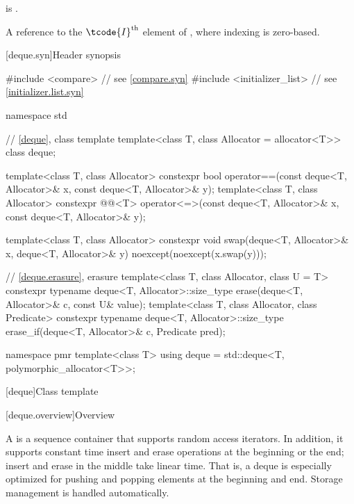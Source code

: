 \begin{itemdescr}
\pnum
\mandates
{} is .

\pnum
\returns
A reference to the $\tcode{I}^\text{th}$ element of ,
where indexing is zero-based.
\end{itemdescr}

[deque.syn]{Header  synopsis}

%
\begin{codeblock}
#include <compare>              // see \ref{compare.syn}
#include <initializer_list>     // see \ref{initializer.list.syn}

namespace std {
  // \ref{deque}, class template 
  template<class T, class Allocator = allocator<T>> class deque;

  template<class T, class Allocator>
    constexpr bool operator==(const deque<T, Allocator>& x, const deque<T, Allocator>& y);
  template<class T, class Allocator>
    constexpr @@<T>
      operator<=>(const deque<T, Allocator>& x, const deque<T, Allocator>& y);

  template<class T, class Allocator>
    constexpr void swap(deque<T, Allocator>& x, deque<T, Allocator>& y)
      noexcept(noexcept(x.swap(y)));

  // \ref{deque.erasure}, erasure
  template<class T, class Allocator, class U = T>
    constexpr typename deque<T, Allocator>::size_type
      erase(deque<T, Allocator>& c, const U& value);
  template<class T, class Allocator, class Predicate>
    constexpr typename deque<T, Allocator>::size_type
      erase_if(deque<T, Allocator>& c, Predicate pred);

  namespace pmr {
    template<class T>
      using deque = std::deque<T, polymorphic_allocator<T>>;
  }
}
\end{codeblock}

[deque]{Class template }

[deque.overview]{Overview}

\pnum
A
%
is a sequence container that supports random access iterators.
In addition, it supports constant time insert and erase operations at the beginning or the end;
insert and erase in the middle take linear time.
That is, a deque is especially optimized for pushing and popping elements at the beginning and end.
Storage management is handled automatically.

